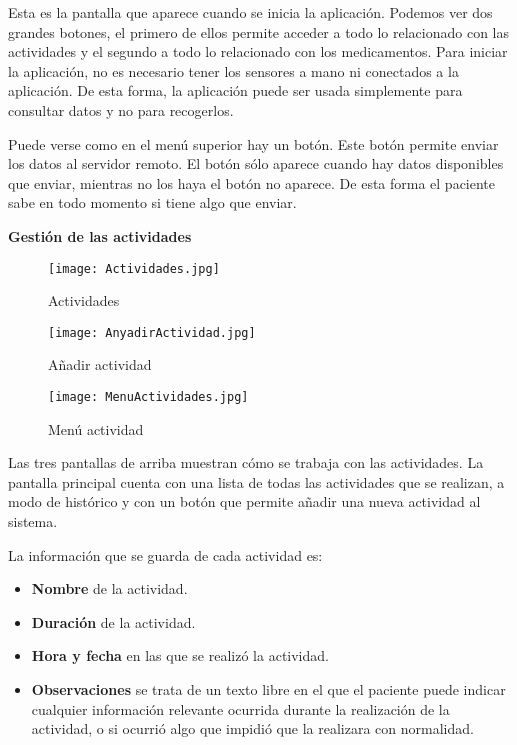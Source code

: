 Esta es la pantalla que aparece cuando se inicia la aplicación. Podemos ver dos grandes botones, el primero de ellos permite acceder a todo lo relacionado con las actividades y el segundo a todo lo relacionado con los medicamentos. Para iniciar la aplicación, no es necesario tener los sensores a mano ni conectados a la aplicación. De esta forma, la aplicación puede ser usada simplemente para consultar datos y no para recogerlos.
\newline

Puede verse como en el menú superior hay un botón. Este botón permite enviar los datos al servidor remoto. El botón sólo aparece cuando hay datos disponibles que enviar, mientras no los haya el botón no aparece. De esta forma el paciente sabe en todo momento si tiene algo que enviar.
\newline

{\bf Gestión de las actividades}
\newline
\begin{figure}[!htb]
  \texttt{[image: Actividades.jpg]}
  \caption{Actividades}
  \label{Actividades}
\endminipage\hfill
{}
  \texttt{[image: AnyadirActividad.jpg]}
  \caption{Añadir actividad}
  \label{Añadir actividad}
\endminipage\hfill
{}%
  \texttt{[image: MenuActividades.jpg]}
  \caption{Menú actividad}
  \label{Menú actividad}
\endminipage
\end{figure}

Las tres pantallas de arriba muestran cómo se trabaja con las actividades. La pantalla principal cuenta con una lista de todas las actividades que se realizan, a modo de histórico y con un botón que permite añadir una nueva actividad al sistema.
\newline

La información que se guarda de cada actividad es:

\begin{itemize}
	\item {\bf Nombre} de la actividad.
	\item {\bf Duración} de la actividad.
	\item {\bf Hora y fecha} en las que se realizó la actividad.
	\item {\bf Observaciones} se trata de un texto libre en el que el paciente puede indicar cualquier información relevante ocurrida durante la realización de la actividad, o si ocurrió algo que impidió que la realizara con normalidad.
\end{itemize}

